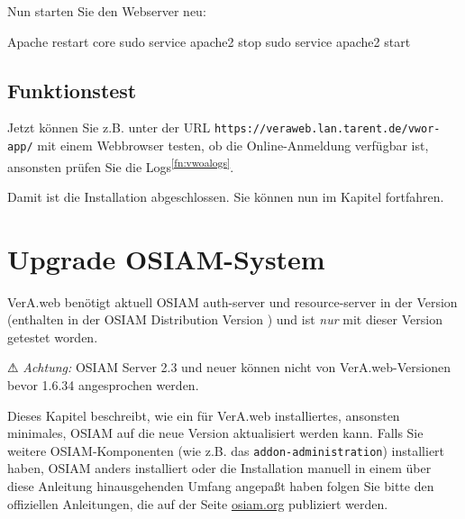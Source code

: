 \begin{minipage}{\textwidth}
Nun starten Sie den Webserver neu:

\begin{lstdump}{Apache restart core}
sudo service apache2 stop
sudo service apache2 start
\end{lstdump}
\end{minipage}

\subsection{Funktionstest}\label{subsec:setup-oa-check}

Jetzt können Sie \dash z.B. unter der URL
\texttt{https://veraweb.lan.tarent.de/vwor-app/} \dash mit einem
Webbrowser testen, ob die Online-Anmeldung verfügbar ist, ansonsten
prüfen Sie die Logs\Hair\textsuperscript{\ref{fn:vwoalogs}}.

\fi%

Damit ist die Installation abgeschlossen.
Sie können nun im Kapitel  fortfahren.

\newpage

\fi%

\ifoa

\section{Upgrade OSIAM-System}\label{sec:upgrade-osiam}

VerA.web benötigt aktuell OSIAM auth-server und resource-server in
der Version \vwiaversosiam{} (enthalten in der OSIAM Distribution
Version \vwiaversodist{}) und ist \emph{nur} mit dieser Version
getestet worden.\keinumbruch

⚠ \emph{Achtung:} OSIAM Server 2.3 und neuer können nicht von
VerA.web-Versionen bevor 1.6.34 angesprochen werden.

Dieses Kapitel beschreibt, wie ein für VerA.web installiertes,
ansonsten minimales, OSIAM auf die neue Version aktualisiert
werden kann. Falls Sie weitere OSIAM-Komponenten (wie z.B.
das \texttt{addon-administration}) installiert haben, OSIAM
anders installiert oder die Installation manuell in einem
über diese Anleitung hinausgehenden Umfang angepaßt haben
folgen Sie bitte den offiziellen Anleitungen, die auf der
Seite \href{http://osiam.org/}{osiam.org} publiziert werden.

